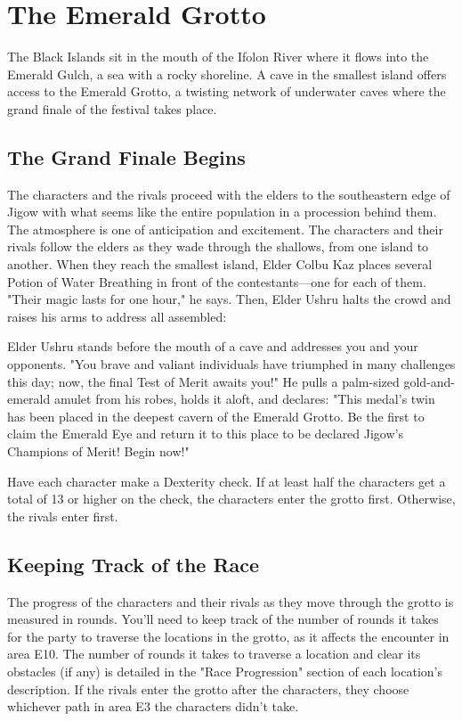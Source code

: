 \documentclass[10pt,a4,twoside,twocolumn,openany,nodeprecatedcode]{dndbook}
\begin{document}
\section{The Emerald Grotto}
The Black Islands sit in the mouth of the Ifolon River where it flows into the Emerald Gulch, a sea with a rocky shoreline. A cave in the smallest island offers access to the Emerald Grotto, a twisting network of underwater caves where the grand finale of the festival takes place.
\subsection{The Grand Finale Begins}
The characters and the rivals proceed with the elders to the southeastern edge of Jigow with what seems like the entire population in a procession behind them. The atmosphere is one of anticipation and excitement.
The characters and their rivals follow the elders as they wade through the shallows, from one island to another. When they reach the smallest island, Elder Colbu Kaz places several Potion of Water Breathing in front of the contestants—one for each of them. "Their magic lasts for one hour," he says.
Then, Elder Ushru halts the crowd and raises his arms to address all assembled:
\begin{DndReadAloud}{}
Elder Ushru stands before the mouth of a cave and addresses you and your opponents. "You brave and valiant individuals have triumphed in many challenges this day; now, the final Test of Merit awaits you!" He pulls a palm-sized gold-and-emerald amulet from his robes, holds it aloft, and declares: "This medal's twin has been placed in the deepest cavern of the Emerald Grotto. Be the first to claim the Emerald Eye and return it to this place to be declared Jigow's Champions of Merit! Begin now!"
\end{DndReadAloud}

Have each character make a Dexterity check. If at least half the characters get a total of 13 or higher on the check, the characters enter the grotto first. Otherwise, the rivals enter first.
\subsection{Keeping Track of the Race}
The progress of the characters and their rivals as they move through the grotto is measured in rounds. You'll need to keep track of the number of rounds it takes for the party to traverse the locations in the grotto, as it affects the encounter in area E10.
The number of rounds it takes to traverse a location and clear its obstacles (if any) is detailed in the "Race Progression" section of each location's description.
If the rivals enter the grotto after the characters, they choose whichever path in area E3 the characters didn't take.
\end{document}
